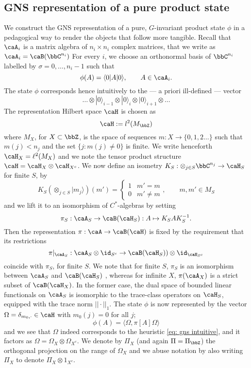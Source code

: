 \subsection{GNS representation of a pure product state}\label{sec:GNS of product state}
We construct the GNS representation of a pure, $G$-invariant product state $\phi$ in a pedagogical way to render the objects that follow more tangible.
Recall that $\caA_i$ is a matrix algebra of $n_i\times n_i$ complex matrices, that we write as $\caA_i= \caB(\bbC^{n_i})$ For every $i$, we choose an orthonormal basis of $\bbC^{n_i}$ labelled by $\sigma=0,\ldots, n_i-1$ such that 
$$
\phi(A)=\langle 0|  A | 0\rangle,\qquad A\in \caA_i.
$$
The state $\phi$ corresponds hence intuitively to the --- a priori ill-defined --- vector 
\begin{equation}\label{eq: gns intuitive}
	\ldots \otimes | 0\rangle_{i-1} \otimes | 0\rangle_i \otimes | 0\rangle_{i+1} \otimes \ldots
\end{equation}
The representation Hilbert space $\caH$ is chosen as 
$$
\caH := l^2(M_\bbZ)
$$
where $M_X$, for $X\subset\bbZ$, is the space of sequences $m:X\to \{0,1,2\ldots\}$ such that $m(j) < n_j$ and the set $\{j: m(j)\neq 0\}$ is finite. We write henceforth $\caH_X=\ell^2(M_X)$  and we note the tensor product structure $\caH=\caH_X \otimes \caH_{X^c}$.
We now define an isometry $K_S: \otimes_{j\in S}\bbC^{n_j}\to\caH_S$ for finite $S$, by 
$$
K_S(\otimes_{j\in S}|m_j\rangle)(m')=\begin{cases}  1 &  m'=m \\
	0 &   m'\neq m
\end{cases},\qquad   m,m'\in M_S
$$
and we lift it to an isomorphism of $C^*$-algebras by setting
$$
\pi_S: \caA_S \to \caB(\caH_S):  A \mapsto K_SA K_S^{-1}.
$$
Then the representation $\pi:\caA\to\caB(\caH)$ is fixed by the requirement that its restrictions 
$$
\pi|_{\caA_S}:  \caA_S \otimes \id_{S^c} \to   \caB(\caH_S))\otimes \id_{\caH_{S^c}}
$$
coincide with $\pi_S$, for finite $S$.  We note that for finite $S$, $\pi_S$ is an isomorphism between $\caA_S$ and $\caB(\caH_S)$ , whereas for infinite $X$,  $\pi(\caA_X)$ is a strict subset of $\caB(\caH_X)$. In the former case, the dual space of bounded linear functionals on $\caA_S$ is isomorphic to the trace-class operators on $\caH_S$, equipped with the trace norm $||\cdot||_1$.
%
%
The state $\phi$ is now represented by the vector $\Omega=\delta_{m_0,\cdot}\in\caH$ with $m_0(j)=0$ for all $j$; 
$$
\phi(A)=\langle\Omega, \pi[A]\Omega\rangle
$$
and we see that $\Omega$ indeed corresponds to the heuristic \eqref{eq: gns intuitive}, and it factors as $\Omega=\Omega_X\otimes\Omega_{X^c}$.  We denote by $\Pi_X$ (and again $\Pi = \Pi_\bbZ$) the orthogonal projection on the range of $\Omega_X$ and we abuse notation by also writing $\Pi_X$ to denote $\Pi_X\otimes 1_{X^c}$.





